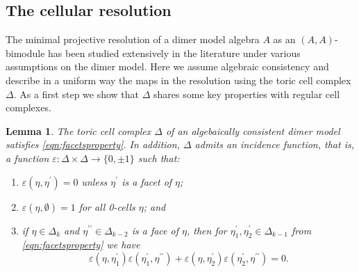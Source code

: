 \documentclass[11pt,a4paper]{amsart}
\numberwithin{equation}{section}
\newtheorem{lemma}[theorem]{Lemma}
\theoremstyle{definition}
\theoremstyle{remark}
\newcommand{\one}{\ensuremath{(\mathrm{i})}}
\newcommand{\two}{\ensuremath{(\mathrm{ii})}}
\newcommand{\three}{\ensuremath{(\mathrm{iii})}}
\begin{document}
  
  
  \subsection{The cellular resolution}
The minimal projective resolution of a dimer model algebra $A$ as an $(A,A)$-bimodule has been studied extensively in the literature \cite{Broomhead, Davison,MozgovoyReineke} under various assumptions on the dimer model. Here we assume algebraic consistency and describe in a uniform way the maps in the resolution using the toric cell complex $\Delta$. As a first step we show that $\Delta$ shares some key properties with regular cell complexes.

\begin{lemma}
\label{lem:dimerincidence}
The toric cell complex $\Delta$ of an algebaically consistent dimer model satisfies \eqref{eqn:facetsproperty}. In addition, $\Delta$ admits an incidence function, that is, a function $\varepsilon\colon \Delta\times \Delta \to \{0,\pm 1\}$ such that:
\begin{enumerate}
\item[\one] $\varepsilon(\eta,\eta^\prime)= 0$ unless $\eta^\prime$ is a facet of $\eta$;
\item[\two] $\varepsilon(\eta,\emptyset) = 1$ for all 0-cells $\eta$; and
\item[\three] if $\eta\in \Delta_k$ and $\eta^{\prime\prime}\in \Delta_{k-2}$ is a face of $\eta$, then for $\eta_1^\prime, \eta_2^\prime\in \Delta_{k-1}$ from \eqref{eqn:facetsproperty} we have 
\begin{equation}
\label{eqn:signconditiondimer}
\varepsilon(\eta,\eta_1^\prime) \varepsilon(\eta_1^\prime,\eta^{\prime\prime}) +\varepsilon(\eta,\eta_2^\prime) \varepsilon(\eta_2^\prime,\eta^{\prime\prime})= 0.
\end{equation}
\end{enumerate}
\end{lemma}
\end{document}
